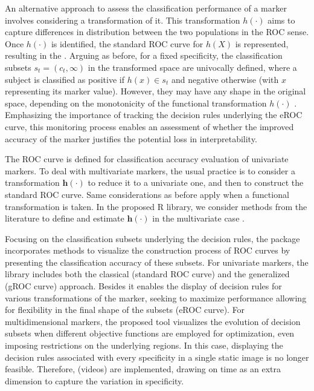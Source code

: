 An alternative approach to assess the classification performance of a marker involves considering a transformation of it. This transformation $h(\cdot)$ aims to capture differences in distribution between the two populations in the ROC sense. Once $h(\cdot)$ is identified, the standard ROC curve for $h(X)$ is represented, resulting in the  \citep{Kauppi2016}. Arguing as before, for a fixed specificity, the classification subsets $s_t=(c_t, \infty)$ in the transformed space are univocally defined, where a subject is classified as positive if $h(x) \in s_t$ and negative otherwise (with $x$ representing its marker value). However, they may have any shape in the original space, depending on the monotonicity of the functional transformation $h(\cdot)$ \citep{Camblor2019a}. Emphasizing the importance of tracking the decision rules underlying the eROC curve, this monitoring process enables an assessment of whether the improved accuracy of the marker justifies the potential loss in interpretability.

The ROC curve is defined for classification accuracy evaluation of univariate markers. To deal with multivariate markers, the usual practice is to consider a transformation $\boldsymbol{h}(\cdot)$ to reduce it to a univariate one, and then to construct the standard ROC curve. Same considerations as before apply when a functional transformation is taken. In the proposed R library, we consider methods from the literature to define and estimate $\boldsymbol{h}(\cdot)$ in the multivariate case \citep{Kang2016, Meisner2021}.


Focusing on the classification subsets underlying the decision rules, the  package incorporates methods to visualize the construction process of ROC curves by presenting the classification accuracy of these subsets.
For univariate markers, the library includes both the classical (standard ROC curve) and the generalized (gROC curve) approach. Besides it enables the display of decision rules for various transformations of the marker, seeking to maximize performance allowing for flexibility in the final shape of the subsets (eROC curve). For multidimensional markers, the proposed tool visualizes the evolution of decision subsets when different objective functions are employed for optimization, even imposing restrictions on the underlying regions. In this case, displaying the decision rules associated with every specificity in a single static image is no longer feasible. Therefore,  (videos) are implemented, drawing on time as an extra dimension to capture the variation in specificity.

